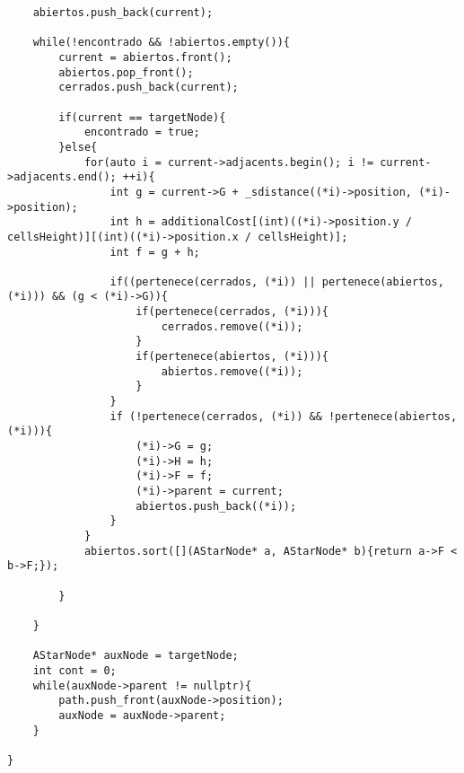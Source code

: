 \begin{lstlisting}
    abiertos.push_back(current);

    while(!encontrado && !abiertos.empty()){
        current = abiertos.front();
        abiertos.pop_front();
        cerrados.push_back(current);

        if(current == targetNode){
            encontrado = true;
        }else{
            for(auto i = current->adjacents.begin(); i != current->adjacents.end(); ++i){
                int g = current->G + _sdistance((*i)->position, (*i)->position);
                int h = additionalCost[(int)((*i)->position.y / cellsHeight)][(int)((*i)->position.x / cellsHeight)];
                int f = g + h;

                if((pertenece(cerrados, (*i)) || pertenece(abiertos, (*i))) && (g < (*i)->G)){
                    if(pertenece(cerrados, (*i))){
                        cerrados.remove((*i));
                    }
                    if(pertenece(abiertos, (*i))){
                        abiertos.remove((*i));
                    }
                }
                if (!pertenece(cerrados, (*i)) && !pertenece(abiertos, (*i))){
                    (*i)->G = g;
                    (*i)->H = h;
                    (*i)->F = f;
                    (*i)->parent = current;
                    abiertos.push_back((*i));
                }
            }
            abiertos.sort([](AStarNode* a, AStarNode* b){return a->F < b->F;});
        
        }

    }

    AStarNode* auxNode = targetNode;
    int cont = 0;
    while(auxNode->parent != nullptr){
        path.push_front(auxNode->position);
        auxNode = auxNode->parent;
    }

}

\end{lstlisting}